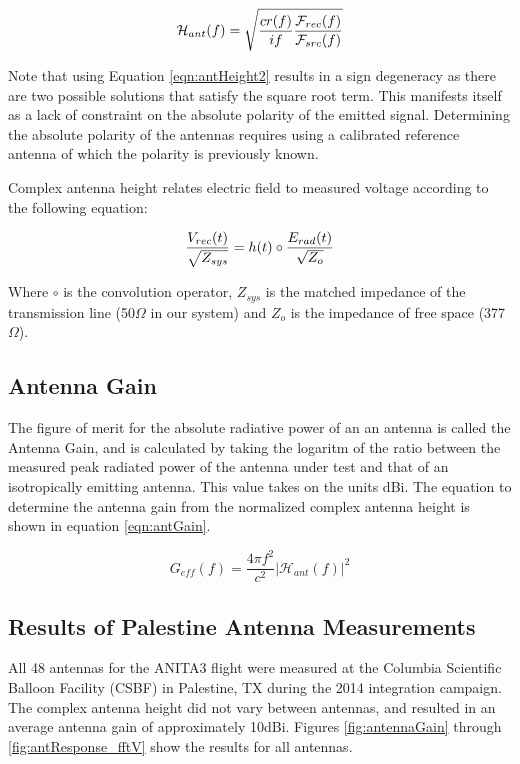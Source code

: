 \begin{equation}
\mathcal{H}_{ant}(f) = \sqrt{ \frac{c r(f)}{if} \frac{\mathcal{F}_{rec}(f)}{\mathcal{F}_{src}(f)} } \\
\label{eqn:antHeight2}
\end{equation}

Note that using Equation \ref{eqn:antHeight2} results in a sign degeneracy as there are two possible solutions that satisfy the square root term.  This manifests itself as a lack of constraint on the absolute polarity of the emitted signal.  Determining the absolute polarity of the antennas requires using a calibrated reference antenna of which the polarity is previously known.


Complex antenna height relates electric field to measured voltage according to the following equation:

\begin{equation}
\frac{V_{rec}(t)}{\sqrt{Z_{sys}}} = h(t) \circ \frac{ E_{rad}(t) }{ \sqrt{Z_{o}} } \\
\label{eqn:antHeight2EField}
\end{equation}

Where $\circ$ is the convolution operator, $Z_{sys}$ is the matched impedance of the transmission line (50$\Omega$ in our system) and $Z_{o}$ is the impedance of free space (377$\Omega$).


	\subsection{Antenna Gain}
		The figure of merit for the absolute radiative power of an an antenna is called the Antenna Gain, and is calculated by taking the logaritm of the ratio between the measured peak radiated power of the antenna under test and that of an isotropically emitting antenna.  This value takes on the units dBi.  The equation to determine the antenna gain from the normalized complex antenna height is shown in equation \ref{eqn:antGain}.
		
\begin{equation}
G_{eff}(f) =  \frac{4\pi f^{2}}{c^{2}} | \mathcal{H}_{ant}(f)|^{2}
\label{eqn:antGain}
\end{equation}

	\subsection{Results of Palestine Antenna Measurements}
	
		All 48 antennas for the ANITA3 flight were measured at the Columbia Scientific Balloon Facility (CSBF) in Palestine, TX during the 2014 integration campaign.  The complex antenna height did not vary between antennas, and resulted in an average antenna gain of approximately 10dBi.  Figures \ref{fig:antennaGain} through \ref{fig:antResponse_fftV} show the results for all antennas.
		

